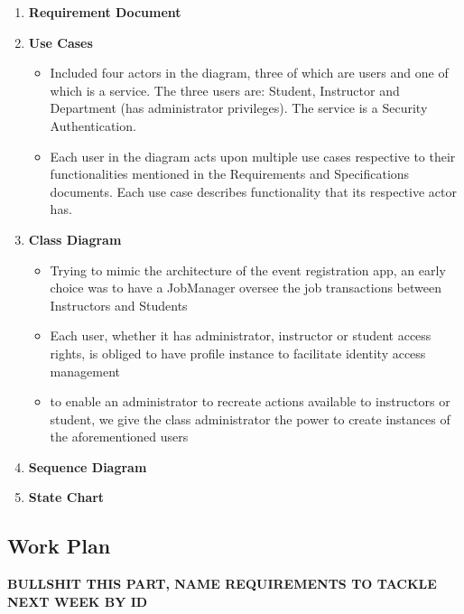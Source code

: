 \documentclass[12pt]{article}
\begin{document}
\begin{enumerate}
    \item \textbf{Requirement Document}
    \item \textbf{Use Cases}
    \begin{itemize}
    	\item Included four actors in the diagram, three of which are users and one of which is a service. The three users are: Student, Instructor and Department (has administrator privileges). The service is a Security Authentication.
    	\item Each user in the diagram acts upon multiple use cases respective to their functionalities mentioned in the Requirements and Specifications documents. Each use case describes functionality that its respective actor has.
    \end{itemize}
    \item \textbf{Class Diagram}
    \begin{itemize}
        \item Trying to mimic the architecture of the event registration app, an early choice was to have a JobManager oversee the job transactions between Instructors and Students
        \item Each user, whether it has administrator, instructor or student access rights, is obliged to have profile instance to facilitate identity access management
        \item to enable an administrator to recreate actions available to instructors or student, we give the class administrator the power to create instances of the aforementioned users
    \end{itemize}
    \item \textbf{Sequence Diagram}
    \item \textbf{State Chart}
\end{enumerate}

\subsection{Work Plan}

\textbf{BULLSHIT THIS PART, NAME REQUIREMENTS TO TACKLE NEXT WEEK BY ID}
\end{document}
